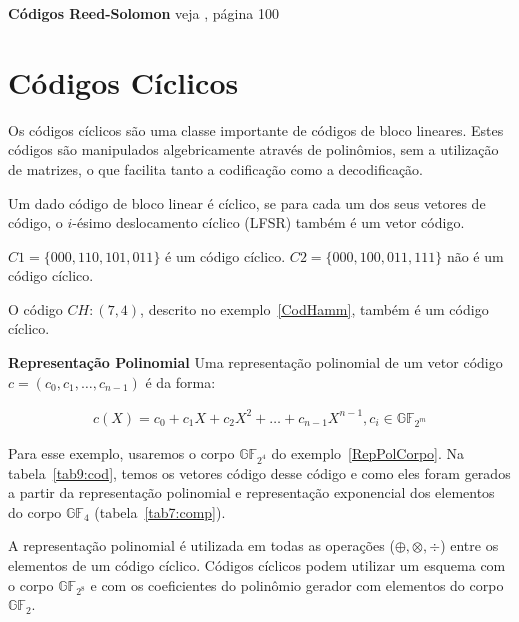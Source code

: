 \begin{example} {\bf Códigos Reed-Solomon} veja \cite{Hefez:2008}, página 100
\end{example}

\section{Códigos Cíclicos}

Os códigos cíclicos são uma classe importante de códigos de bloco lineares. Estes códigos são manipulados algebricamente através de polinômios, sem a utilização de matrizes, o que facilita tanto a codificação como a decodificação.

\begin{definition} Um dado código de bloco linear é cíclico, se para cada um dos seus vetores de código, o $i$-ésimo deslocamento cíclico (LFSR) também é um vetor código.
\end{definition}

\begin{example}
$C1 = \{000, 110, 101, 011\}$ é um código cíclico. $C2 = \{000, 100, 011, 111\}$ não é um código cíclico.

O código $CH:(7,4)$, descrito no exemplo~\ref{CodHamm}, também é um código cíclico.
\end{example}

\begin{definition} {\bf Representação Polinomial} \label{RepPol}  Uma representação polinomial de um vetor código $c=(c_0,c_1, \ldots, c_{n-1})$ é da forma:

\begin{align*}
c(X)=c_0 + c_1X + c_2X^2 + \ldots + c_{n-1}X^{n-1}, c_i \in \mathbb{GF}_{2^m}
\end{align*}

\end{definition}

\begin{example}
Para esse exemplo, usaremos o corpo $\mathbb{GF}_{2^4}$ do exemplo~\ref{RepPolCorpo}. Na tabela~\ref{tab9:cod}, temos os vetores código desse código e como eles foram gerados a partir da representação polinomial e representação exponencial dos elementos do corpo $\mathbb{GF}_4$ (tabela~\ref{tab7:comp}).

\end{example}

A representação polinomial é utilizada em todas as operações ($\oplus, \otimes, \div$) entre os elementos de um código cíclico. Códigos cíclicos podem utilizar um esquema com  o corpo $\mathbb{GF}_{2^8}$ e com  os coeficientes do polinômio gerador com elementos do corpo $\mathbb{GF}_{2}$.


